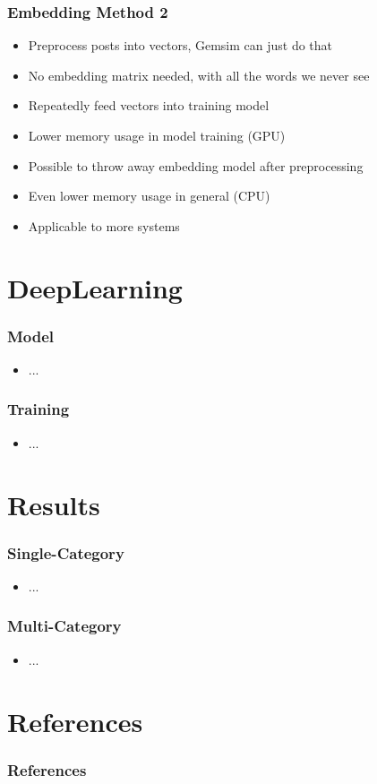 \documentclass[compress,aspectratio=169]{beamer} %
\begin{document}
\begin{frame}[fragile]
	\frametitle{Embedding Method 2}
	\begin{itemize}
		\item Preprocess posts into vectors, Gemsim can just do that
		\item No embedding matrix needed, with all the words we never see
		\item Repeatedly feed vectors into training model
		\item Lower memory usage in model training (GPU)
		\item Possible to throw away embedding model after preprocessing
		\item Even lower memory usage in general (CPU)
		\item Applicable to more systems
	\end{itemize}
\end{frame}


\section{DeepLearning}

\begin{frame}[fragile]
	\frametitle{Model}
	\begin{itemize}
		\item ...
	\end{itemize}
\end{frame}

\begin{frame}[fragile]
	\frametitle{Training}
	\begin{itemize}
		\item ...
	\end{itemize}
\end{frame}

\section{Results}

\begin{frame}[fragile]
	\frametitle{Single-Category}
	\begin{itemize}
		\item ...
	\end{itemize}
\end{frame}

\begin{frame}[fragile]
	\frametitle{Multi-Category}
	\begin{itemize}
		\item ...
	\end{itemize}
\end{frame}


\section*{References}

\begin{frame}[t]%
	\frametitle{References}

	\tiny%
	
	
\end{frame}
\end{document}
